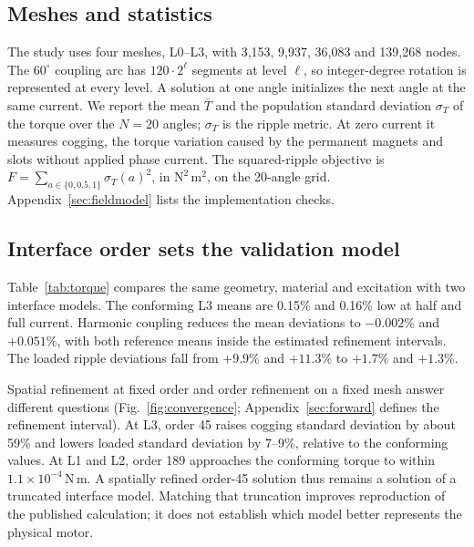 \documentclass{anvil-paper}
\begin{document}
\subsection{Meshes and statistics}
The study uses four meshes, L0--L3, with 3,153, 9,937, 36,083 and
139,268 nodes. The $60^\circ$ coupling arc has $120\cdot2^\ell$ segments at level
$\ell$, so integer-degree rotation is represented at every level.
A solution at one angle initializes the next angle at the same current.
We report the mean $\bar T$ and the population standard deviation
$\sigma_T$ of the torque over the $N=20$ angles; $\sigma_T$ is the ripple
metric. At zero current it measures
cogging, the torque variation caused by the permanent magnets and slots
without applied phase current. The squared-ripple objective is
$F=\sum_{a\in\{0,0.5,1\}}\sigma_T(a)^2$, in $\mathrm{N^2\,m^2}$, on the
20-angle grid. Appendix~\ref{sec:fieldmodel} lists the implementation checks.

\subsection{Interface order sets the validation model}\label{sec:coupling-results}
Table~\ref{tab:torque} compares the same geometry, material and excitation
with two interface models. The conforming L3 means are 0.15\% and 0.16\%
low at half and full current. Harmonic coupling reduces the mean deviations
to $-0.002\%$ and $+0.051\%$, with both reference means inside the estimated
refinement intervals. The loaded ripple deviations fall from $+9.9\%$
and $+11.3\%$ to $+1.7\%$ and $+1.3\%$.

\begin{table}[htbp]\centering\small
\caption{L3 population standard deviation and mean torque, in N\,m per
sector, on the 20-angle grid. The last column gives ripple deviation from the
saved reference; n/a identifies the reference itself. The reference is
subsequently refined in Section~\ref{sec:refinement}.}
\label{tab:torque}

\end{table}

Spatial refinement at fixed order and order refinement on a fixed mesh
answer different questions (Fig.~\ref{fig:convergence}; Appendix~\ref{sec:forward} defines the refinement interval). At L3, order 45
raises cogging standard deviation by about 59\% and lowers loaded
standard deviation by 7--9\%, relative to the conforming values. At L1 and L2,
order 189 approaches the conforming torque to within $1.1\times10^{-4}$\,N\,m.
A spatially refined order-45 solution thus remains a solution of a
truncated interface model. Matching that truncation improves reproduction
of the published calculation; it does not establish which model better
represents the physical motor.
\end{document}
